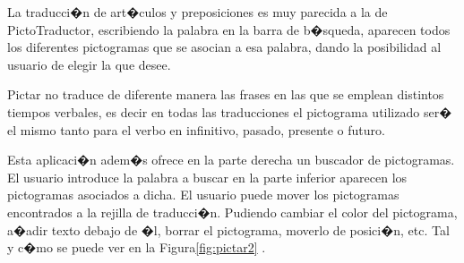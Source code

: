La traducci�n de art�culos y preposiciones es muy parecida a la de PictoTraductor, escribiendo la palabra en la barra de b�squeda, aparecen todos los diferentes pictogramas que se asocian a esa palabra, dando la posibilidad al usuario de elegir la que desee.

Pictar no traduce de diferente manera las frases en las que se emplean distintos tiempos verbales, es decir en todas las traducciones el pictograma utilizado ser� el mismo tanto para el verbo en infinitivo, pasado, presente o futuro.

Esta aplicaci�n adem�s ofrece en la parte derecha un buscador de pictogramas. El usuario introduce la palabra a buscar en la parte inferior aparecen los pictogramas asociados a dicha.
El usuario puede mover los pictogramas encontrados a la rejilla de traducci�n. Pudiendo cambiar el color del pictograma, a�adir texto debajo de �l, borrar el pictograma, moverlo de posici�n, etc. Tal y c�mo se puede ver en la Figura\ref{fig:pictar2} .

